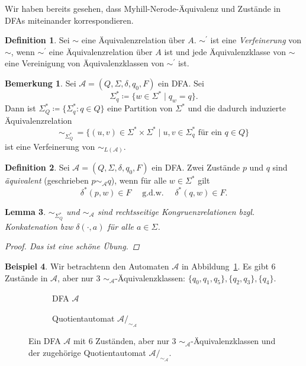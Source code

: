 \documentclass[11pt, a4paper]{article}
\theoremstyle{definition}
\newtheorem{definition}{Definition}[section]
\newtheorem{example}[definition]{Beispiel}
\newtheorem*{remark*}{Bemerkung}
\theoremstyle{plain}
\newtheorem{lemma}[definition]{Lemma}
\numberwithin{equation}{section}
\begin{document}
Wir haben bereits gesehen, dass Myhill-Nerode-Äquivalenz und Zustände in DFAs miteinander korrespondieren. 
\begin{definition}
	Sei $\sim$ eine Äquivalenzrelation über $A$. $\sim^\prime$ ist eine \textit{Verfeinerung} von $\sim$, wenn $\sim^\prime$ eine Äquivalenzrelation über $A$ ist und jede Äquivalenzklasse von $\sim$ eine Vereinigung von Äquivalenzklassen von $\sim^\prime$ ist.
\end{definition}
\begin{remark*}
	Sei $\mathcal{A} = (Q, \Sigma, \delta, q_0, F)$ ein DFA. Sei
	$$
		\Sigma^\ast_q \coloneqq \{w \in \Sigma^\ast \mid q_w = q\}.
	$$
	Dann ist $\Sigma^\ast_Q \coloneqq \{\Sigma^\ast_q : q \in Q\}$ eine Partition von $\Sigma^\ast$ und die dadurch induzierte Ä\-qui\-va\-lenz\-re\-la\-tion 
	$$
		\sim_{\Sigma^\ast_Q} \,= \{(u, v) \in \Sigma^\ast \times \Sigma^\ast \mid u, v \in \Sigma^\ast_q \text{ für ein } q \in Q\}
	$$
	ist eine Verfeinerung von $\sim_{L(\mathcal{A})}$.
\end{remark*}
\begin{definition}
	Sei $\mathcal{A} = (Q, \Sigma, \delta, q_0, F)$ ein DFA. Zwei Zustände $p$ und $q$ sind \textit{äquivalent} (geschrieben $p \sim_\mathcal{A} q$), wenn für alle $w \in \Sigma^\ast$ gilt
	$$
		\delta^\ast(p, w) \in F \quad\text{ g.d.w. }\quad \delta^\ast(q, w) \in F.
	$$
\end{definition}
\begin{lemma}\label{lem:state_equivalence}
	$\sim_{\Sigma^\ast_Q}$ und $\sim_\mathcal{A}$ sind rechtsseitige Kongruenzrelationen bzgl. Konkatenation bzw $\delta(\cdot, a)$ für alle $a \in \Sigma$.
	\begin{proof}
		Das ist eine schöne Übung.
	\end{proof}
\end{lemma}
\begin{example}\label{exp:state_equivalence}
	Wir betrachtenn den Automaten $\mathcal{A}$ in Abbildung~\ref{fig:state_equivalence_o}. Es gibt 6 Zustände in $\mathcal{A}$, aber nur 3 $\sim_\mathcal{A}$-Äquivalenzklassen: $\{q_0, q_1, q_5\}, \{q_2, q_3\}, \{q_4\}$.
\end{example}
\begin{figure}
	\centering
	\begin{subfigure}[b]{.49\textwidth}
		\centering
		
		\caption{DFA $\mathcal{A}$}
		\label{fig:state_equivalence_o}
	\end{subfigure}
	\begin{subfigure}[b]{.49\textwidth}
		\centering
		
		\caption{Quotientautomat $\mathcal{A}/_{\sim_\mathcal{A}}$}
		\label{fig:state_equivalence_q}
	\end{subfigure}
	\caption{Ein DFA $\mathcal{A}$ mit 6 Zuständen, aber nur 3 $\sim_\mathcal{A}$-Äquivalenzklassen und der zugehörige Quotientautomat $\mathcal{A}/_{\sim_\mathcal{A}}$.}
	\label{fig:state_equivalence}
\end{figure}
\end{document}
